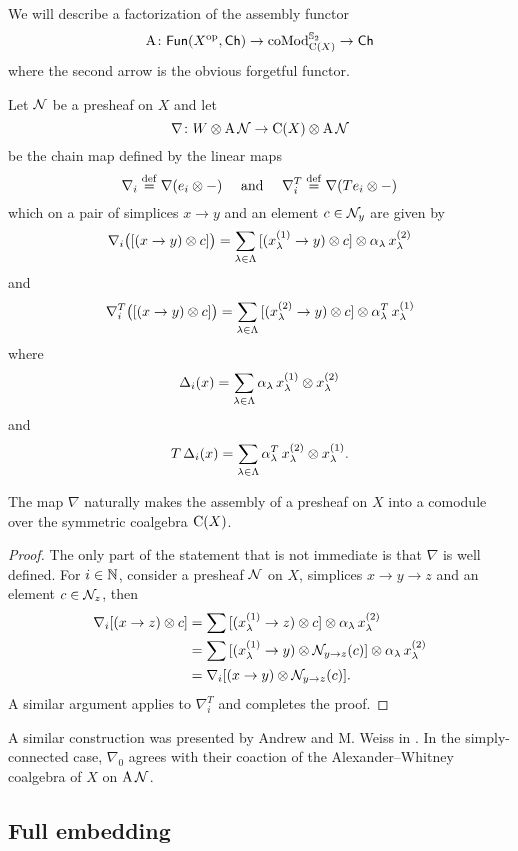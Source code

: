 We will describe a factorization of the assembly functor
\[
\operatorname{A} \colon \mathsf{Fun}(X^{\mathrm{op}}, \mathsf{Ch}) \to \operatorname{coMod}^{\mathbb{S}_2}_{\operatorname{C}(X)} \to \mathsf{Ch}
\]
where the second arrow is the obvious forgetful functor.

Let $\mathcal{N}$ be a presheaf on $X$ and let
\[
\nabla \colon W \otimes \operatorname{A} \mathcal{N} \to \operatorname{C}(X) \otimes \operatorname{A} \mathcal{N}
\]
be the chain map defined by the linear maps
\[
\nabla_i \stackrel{\mathrm{def}}{=} \nabla(e_i \otimes -)
\quad \text{ and } \quad
\nabla_i^T \stackrel{\mathrm{def}}{=} \nabla(Te_i \otimes -)
\]
which on a pair of simplices $x \to y$ and an element $c \in \mathcal{N}_y$ are given by
\[
\nabla_i \big( [(x \to y) \otimes c] \big) =
\sum_{\lambda \in \Lambda} {[(x_\lambda^{(1)} \to y) \otimes c]} \otimes \alpha_\lambda \, x_\lambda^{(2)}
\]
and
\[
\nabla_i^T \big( [(x \to y) \otimes c] \big) =
\sum_{\lambda \in \Lambda} {[(x_\lambda^{(2)} \to y) \otimes c]} \otimes \alpha^T_\lambda \, x_\lambda^{(1)}
\]
where
\[
\operatorname{\Delta}_i(x) = \sum_{\lambda \in \Lambda} \alpha_\lambda \, x_\lambda^{(1)} \otimes x_\lambda^{(2)}
\]
and
\[
T \operatorname{\Delta}_i(x) =
\sum_{\lambda \in \Lambda} \alpha^T_\lambda \, x_\lambda^{(2)} \otimes x_\lambda^{(1)}.
\]

\begin{lemma*}
	The map $\nabla$ naturally makes the assembly of a presheaf on $X$ into a comodule over the symmetric coalgebra $\operatorname{C}(X)$.
\end{lemma*}

\begin{proof}
	The only part of the statement that is not immediate is that $\nabla$ is well defined.
	For $i \in \mathbb{N}$, consider a presheaf $\mathcal{N}$ on $X$, simplices $x \to y \to z$ and an element $c \in \mathcal{N}_z$, then
	\begin{align*}
		\nabla_i [(x \to z) \otimes c] &=
		\sum {[(x^{(1)}_\lambda \to z) \otimes c]} \otimes \alpha_\lambda \, x^{(2)}_\lambda \\ &=
		\sum {[(x^{(1)}_\lambda \to y) \otimes\mathcal{N}_{y \to z}(c)]} \otimes \alpha_\lambda \, x^{(2)}_\lambda \\ &=
		\nabla_i [(x \to y) \otimes \mathcal{N}_{y \to z}(c)].
	\end{align*}
	A similar argument applies to $\nabla^T_i$ and completes the proof.
\end{proof}

A similar construction was presented by Andrew and M. Weiss in \cite[Proposition~5.3]{ranicki1990assembly}.
In the simply-connected case, $\nabla_0$ agrees with their coaction of the Alexander--Whitney coalgebra of $X$ on $\operatorname{A} \mathcal{N}$.

\subsection{Full embedding}\label{ss:full embedding}

